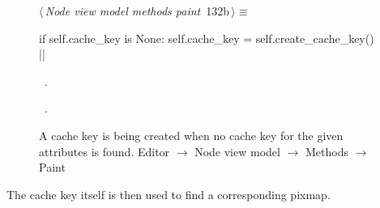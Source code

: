 \documentclass[%
    a4paper,    %
    justified,  %
    nobib,      %
    openany     %
]{tufte-book}
\makeatletter
\renewcommand{\label}[1]{\@tufte@label{##1}}%
\makeatother
\begin{document}
\begin{figure}[!htbp]
\begin{flushleft} \small
\begin{minipage}{\linewidth}\label{scrap77}\raggedright\small
{} $\langle\,${\itshape Node view model methods paint}\nobreak\ {\footnotesize {132b}}$\,\rangle\equiv$
\vspace{-1ex}
\begin{pythoncode}
if self.cache_key is None:
    self.cache_key = self.create_cache_key()
|\NWsep|
\end{pythoncode}
\vspace{1.5ex}
\footnotesize
\begin{list}{}{\setlength{\itemsep}{-\parsep}\setlength{\itemindent}{-\leftmargin}}
\item \NWtxtMacroDefBy\ .
\item \NWtxtMacroRefIn\ .

\item{}
\end{list}
\end{minipage}\vspace{4ex}
\end{flushleft}
\caption{A cache key is being created when no cache key for the given attributes
  is found.
  \newline{}\newline{}Editor $\rightarrow$ Node view model $\rightarrow$
  Methods $\rightarrow$ Paint}
\end{figure}

The cache key itself is then used to find a corresponding pixmap.
\end{document}
